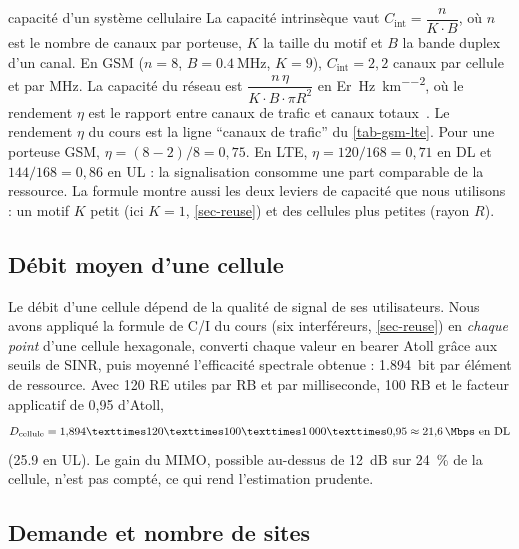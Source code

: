 \begin{cours}{capacité d'un système cellulaire}
La capacité intrinsèque vaut $C_{\text{int}} = \dfrac{n}{K \cdot B}$, où $n$ est le nombre de canaux par porteuse, $K$ la taille du motif et $B$ la bande duplex d'un canal. En GSM ($n = 8$, $B = \SI{0,4}{\mega\hertz}$, $K = 9$), $C_{\text{int}} = 2{,}2$ canaux par cellule et par MHz. La capacité du réseau est $\dfrac{n\,\eta}{K \cdot B \cdot \pi R^2}$ en \si{Er\per\hertz\per\kilo\metre\squared}, où le rendement $\eta$ est le rapport entre canaux de trafic et canaux totaux~\cite{afif2026cours}.
\application Le rendement $\eta$ du cours est la ligne \enquote{canaux de trafic} du \cref{tab-gsm-lte}. Pour une porteuse GSM, $\eta = (8 - 2)/8 = 0{,}75$. En LTE, $\eta = 120/168 = 0{,}71$ en DL et $144/168 = 0{,}86$ en UL : la signalisation consomme une part comparable de la ressource. La formule montre aussi les deux leviers de capacité que nous utilisons : un motif $K$ petit (ici $K = 1$, \cref{sec-reuse}) et des cellules plus petites (rayon $R$).
\end{cours}

\subsection{Débit moyen d'une cellule}

Le débit d'une cellule dépend de la qualité de signal de ses utilisateurs. Nous avons appliqué la formule de C/I du cours (six interféreurs, \cref{sec-reuse}) en \emph{chaque point} d'une cellule hexagonale, converti chaque valeur en bearer Atoll grâce aux seuils de SINR, puis moyenné l'efficacité spectrale obtenue : \SI{1,894}{bit} par élément de ressource. Avec 120 RE utiles par RB et par milliseconde, 100 RB et le facteur applicatif de 0,95 d'Atoll,
\begin{equation}
  D_{\text{cellule}} = 1{,}894 × 120 × 100 × \num{1000} × 0{,}95 \approx \SI{21,6}{\Mbps} \text{ en DL}
\end{equation}
(\SI{25,9}{\Mbps} en UL). Le gain du MIMO, possible au-dessus de \SI{12}{\deci\bel} sur \SI{24}{\percent} de la cellule, n'est pas compté, ce qui rend l'estimation prudente.

\subsection{Demande et nombre de sites}

